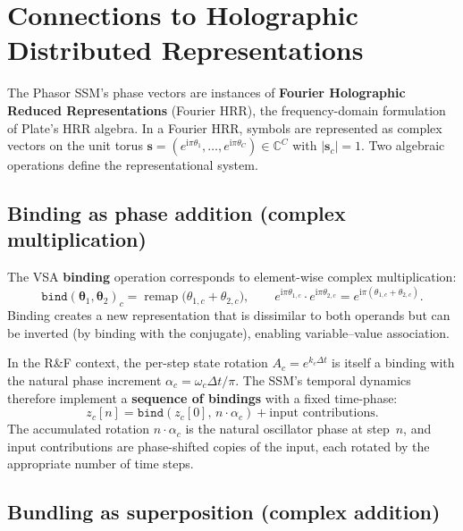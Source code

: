 \documentclass[11pt]{article}
\newcommand{\C}{\mathbb{C}}
\newcommand{\im}{\mathrm{i}}
\newcommand{\dt}{\Delta t}
\theoremstyle{definition}
\begin{document}
\section{Connections to Holographic Distributed Representations}
\label{sec:hd}

The Phasor SSM's phase vectors are instances of
\textbf{Fourier Holographic Reduced Representations} (Fourier HRR),
the frequency-domain formulation of Plate's HRR algebra.
In a Fourier HRR, symbols are represented as complex vectors on the unit
torus $\bm{s} = (e^{\im\pi\theta_1},\dots,e^{\im\pi\theta_C}) \in \C^C$
with $|\bm{s}_c| = 1$. Two algebraic operations define the representational
system.

\subsection{Binding as phase addition (complex multiplication)}

The VSA \textbf{binding} operation corresponds to element-wise
complex multiplication:
\begin{equation}\label{eq:bind}
  \texttt{bind}(\bm\theta_1, \bm\theta_2)_c
    = \operatorname{remap}\bigl(\theta_{1,c} + \theta_{2,c}\bigr),
  \qquad
  e^{\im\pi\theta_{1,c}} \cdot e^{\im\pi\theta_{2,c}}
    = e^{\im\pi(\theta_{1,c}+\theta_{2,c})}.
\end{equation}
Binding creates a new representation that is dissimilar to both operands
but can be inverted (by binding with the conjugate), enabling
variable--value association.

In the R\&F context, the per-step state rotation
$A_c = e^{k_c\dt}$ is itself a binding with the natural phase increment
$\alpha_c = \omega_c\dt/\pi$. The SSM's temporal dynamics therefore
implement a \textbf{sequence of bindings} with a fixed time-phase:
\begin{equation}
  z_c[n] = \texttt{bind}(z_c[0],\, n\cdot\alpha_c)
            + \text{input contributions}.
\end{equation}
The accumulated rotation $n\cdot\alpha_c$ is the natural oscillator
phase at step~$n$, and input contributions are phase-shifted copies
of the input, each rotated by the appropriate number of time steps.

\subsection{Bundling as superposition (complex addition)}
\end{document}
